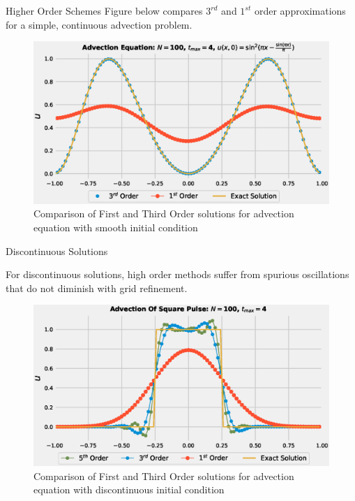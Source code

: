 \documentclass[9pt]{beamer}
\begin{document}
\begin{frame}{Higher Order Schemes}
  Figure below compares $3^{rd}$ and $1^{st}$ order approximations for a simple, continuous advection problem.
    \begin{figure}[H]
      \centering
      \includegraphics[scale=0.45]{AdvectionHighOrderComparison.eps}\caption{Comparison of First and Third Order solutions for advection equation with smooth initial condition}
        \label{fig:First/HighOrderComparison}
      \end{figure}

\end{frame}

\begin{frame}{Discontinuous Solutions}

  For discontinuous solutions, high order methods suffer from spurious oscillations that do not diminish with grid refinement.
  
  \begin{figure}[H]
    \centering
    \includegraphics[scale=0.45]{AdvectionHighOrderComparison_pulse.eps}\caption{Comparison of First and Third Order solutions for advection equation with discontinuous initial condition}
      \label{fig:First/HighOrderComparison_pulse}
    \end{figure}
\end{frame}
\end{document}

